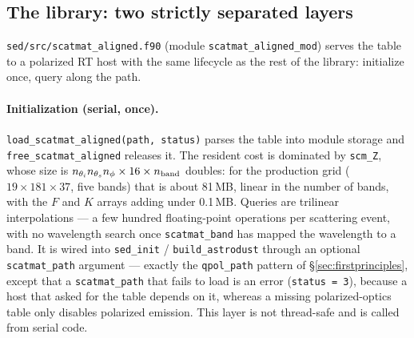 \documentclass{my_memo}
\newcommand{\code}[1]{\texttt{#1}}
\begin{document}
\subsection{The library: two strictly separated layers}\label{sec:aligned:lib}

\code{sed/src/scatmat\_aligned.f90} (module \code{scatmat\_aligned\_mod}) serves
the table to a polarized RT host with the same lifecycle as the rest of the
library: initialize once, query along the path.

\paragraph{Initialization (serial, once).} \code{load\_scatmat\_aligned(path,
status)} parses the table into module storage and \code{free\_scatmat\_aligned}
releases it. The resident cost is dominated by \code{scm\_Z}, whose size is
$n_{\theta_i}n_{\theta_s}n_\phi\times16\times n_{\rm band}$ doubles: for the
production grid ($19\times181\times37$, five bands) that is about 81\,MB, linear
in the number of bands, with the $F$ and $K$ arrays adding under 0.1\,MB. Queries
are trilinear interpolations --- a few hundred floating-point operations per
scattering event, with no wavelength search once \code{scatmat\_band} has mapped
the wavelength to a band. It is wired into
\code{sed\_init} / \code{build\_astrodust} through an optional \code{scatmat\_path}
argument --- exactly the \code{qpol\_path} pattern of \S\ref{sec:firstprinciples},
except that a \code{scatmat\_path} that fails to load is an error (\code{status =
3}), because a host that asked for the table depends on it, whereas a missing
polarized-optics table only disables polarized emission. This layer is not
thread-safe and is called from serial code.
\end{document}
